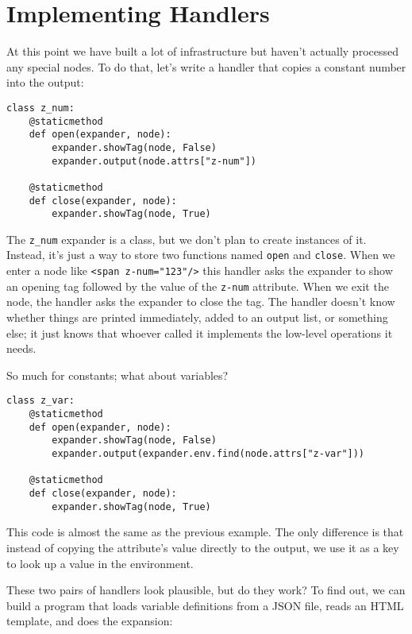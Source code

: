 \documentclass{scrbook}
\begin{document}
\section{Implementing Handlers}\label{templating-handlers}


At this point
we have built a lot of infrastructure but haven't actually processed any special nodes.
To do that,
let's write a handler that copies a constant number into the output:


\begin{lstlisting}[frame=single,frameround=tttt]
class z_num:
    @staticmethod
    def open(expander, node):
        expander.showTag(node, False)
        expander.output(node.attrs["z-num"])

    @staticmethod
    def close(expander, node):
        expander.showTag(node, True)
\end{lstlisting}



\noindent The \texttt{z\_num} expander is a class,
but we don't plan to create instances of it.
Instead,
it's just a way to store two functions named \texttt{open} and \texttt{close}.
When we enter a node like \texttt{<span z-num="123"/>}
this handler asks the expander to show an opening tag
followed by the value of the \texttt{z-num} attribute.
When we exit the node,
the handler asks the expander to close the tag.
The handler doesn't know whether things are printed immediately,
added to an output list,
or something else;
it just knows that whoever called it implements the low-level operations it needs.


So much for constants; what about variables?


\begin{lstlisting}[frame=single,frameround=tttt]
class z_var:
    @staticmethod
    def open(expander, node):
        expander.showTag(node, False)
        expander.output(expander.env.find(node.attrs["z-var"]))

    @staticmethod
    def close(expander, node):
        expander.showTag(node, True)
\end{lstlisting}



\noindent This code is almost the same as the previous example.
The only difference is that instead of copying the attribute's value
directly to the output,
we use it as a key to look up a value in the environment.


These two pairs of handlers look plausible, but do they work?
To find out,
we can build a program that loads variable definitions from a JSON file,
reads an HTML template,
and does the expansion:
\end{document}
